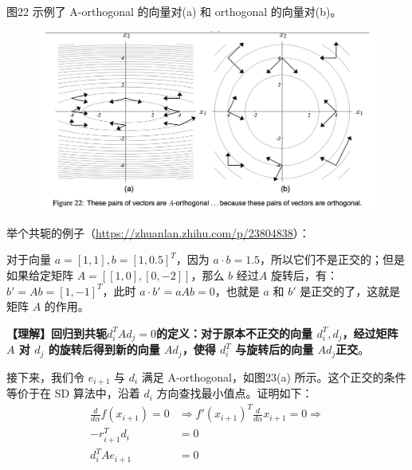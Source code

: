 \documentclass[12pt]{article}
\begin{document}
图22 示例了 A-orthogonal 的向量对(a) 和 orthogonal 的向量对(b)。
\begin{figure}[H]
    \centering
    \includegraphics[width=1\textwidth]{fig/CG_Convergence_CD_2.png}
\end{figure}

\begin{framed}
举个共轭的例子（\url{https://zhuanlan.zhihu.com/p/23804838}）：

对于向量 $a = [1,1], b = [1, 0.5]^T$，因为 $a\cdot b = 1.5$，所以它们不是正交的；但是如果给定矩阵 $A = [[1,0],[0,-2]]$，那么 $b$ 经过$A$ 旋转后，有：$b' = Ab = [1,-1]^T$，此时 $a \cdot b' = aAb = 0$，也就是 $a$ 和 $b'$ 是正交的了，这就是矩阵 $A$ 的作用。

\textbf{【理解】回归到共轭$d_i^TAd_j = 0$的定义：对于原本不正交的向量 $d_i^T, d_j$，经过矩阵 $A$ 对 $d_j$ 的旋转后得到新的向量 $Ad_j$，使得 $d_i^T$ 与旋转后的向量 $Ad_j$正交}。
\end{framed}

接下来，我们令 $e_{i+1}$ 与 $d_i$ 满足 A-orthogonal，如图23(a) 所示。这个正交的条件等价于在 SD 算法中，沿着 $d_i$ 方向查找最小值点。证明如下：
\begin{align*}
\frac{d}{d\alpha}f(x_{i+1}) = 0 &\Rightarrow f'(x_{i+1})^T \frac{d}{d\alpha}x_{i+1} = 0 \Rightarrow \\
-r^T_{i+1}d_i &= 0 \\
d^T_iAe_{i+1} &= 0
\end{align*}
\end{document}
